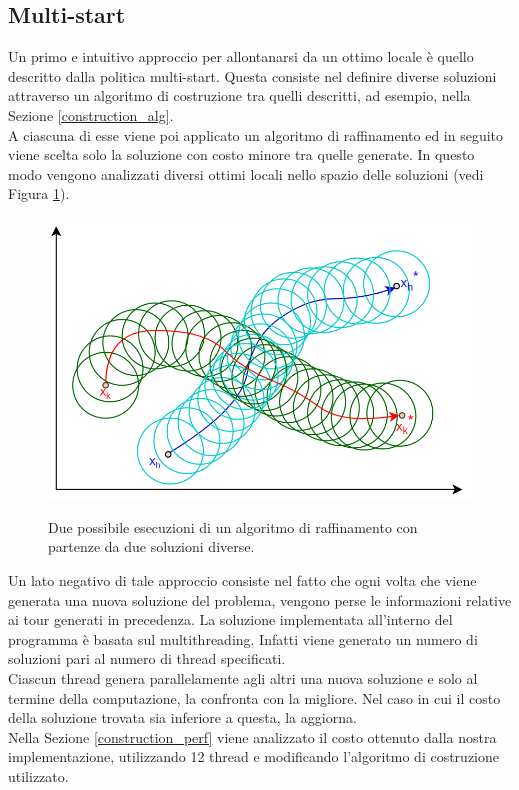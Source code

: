 \subsection{Multi-start}
Un primo e intuitivo approccio per allontanarsi da un ottimo locale è quello descritto dalla politica multi-start. Questa consiste nel definire diverse soluzioni attraverso un algoritmo di costruzione tra quelli descritti, ad esempio, nella Sezione \ref{construction_alg}.\\
A ciascuna di esse viene poi applicato un algoritmo di raffinamento ed in seguito  viene scelta solo la soluzione con costo minore tra quelle generate. In questo modo vengono analizzati diversi ottimi locali nello spazio delle soluzioni (vedi Figura \ref{multi_start}). 
\begin{figure}[H] 
\begin{center} 
  \includegraphics[scale=0.4]{Images/multistart}\\ 
  \caption{\footnotesize{Due possibile esecuzioni di un algoritmo di raffinamento con partenze da due soluzioni diverse.}}
  \label{multi_start}
\end{center}
\end{figure}
Un lato negativo di tale approccio consiste nel fatto che ogni volta che viene generata una nuova soluzione del problema, vengono perse le informazioni relative ai tour generati in precedenza. La soluzione implementata all'interno del programma è basata sul multithreading. Infatti viene generato un numero di soluzioni pari al numero di thread specificati.\\
Ciascun thread genera parallelamente agli altri una nuova soluzione e solo al termine della computazione, la confronta con la migliore. Nel caso in cui il costo della soluzione trovata sia inferiore a questa, la aggiorna. \\
Nella Sezione \ref{construction_perf} viene analizzato il costo ottenuto dalla nostra implementazione, utilizzando 12 thread e modificando l'algoritmo di costruzione utilizzato.\\

